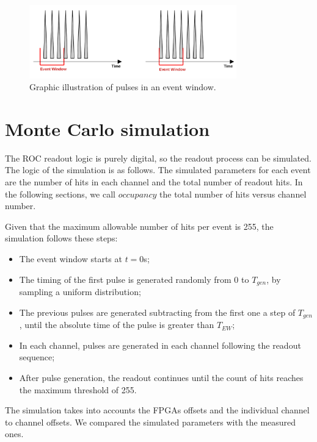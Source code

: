 \begin{figure}[!h]
\centering
\includegraphics[width =0.8\textwidth]{figures/pdf/finalimg}
\caption{Graphic illustration of pulses in an event window.}
\label{fig:3}
\end{figure}
\section{Monte Carlo simulation}\label{MonteCarlo}
 
The ROC readout logic is purely digital, so the readout process can be simulated. 
The logic of the simulation is as follows.
The simulated parameters for each event are the number of hits in each channel and the total number of readout hits.
In the following sections, we call $occupancy$ the total number of hits versus channel number.

Given that the maximum allowable number of hits per event is 255, the simulation follows these steps:
\begin{itemize}
\item The event window starts at $t=0$s;
  \item The timing of the first pulse is generated randomly from 0 to $T_{gen}$, by sampling a uniform distribution;
    \item The previous pulses are generated subtracting from the first one a step of $T_{gen}$, until the absolute time of the pulse is greater than $T_{EW}$;
\item In each channel, pulses are generated in each channel following the readout sequence;
  \item After pulse generation, the readout continues until the count of hits reaches the maximum threshold of 255. 
\end{itemize}

The simulation takes into accounts the FPGAs offsets and the individual channel to channel offsets. 
We compared the simulated parameters with the measured ones. 



